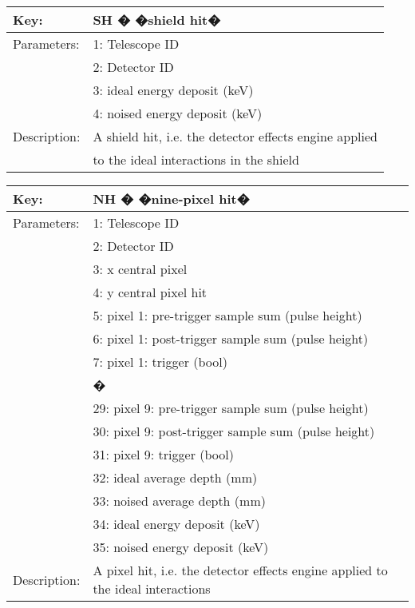 \begin{table}[htdp]
\begin{center}
\begin{tabular}{|p{2cm}|p{12cm}|}
\hline
Key:&	SH � �shield hit�\\
\hline
Parameters:&	1: Telescope ID\\
&2: Detector ID\\
&3: ideal energy deposit (keV)\\
&4: noised energy deposit (keV)\\
\hline
Description:&	A shield hit, i.e. the detector effects engine applied \\
& to the ideal interactions in the shield\\
\hline
\end{tabular}
\end{center}
\end{table}

\begin{table}[htdp]
\begin{center}
\begin{tabular}{|p{2cm}|p{12cm}|}
\hline
Key:&	NH � �nine-pixel hit�\\
\hline
Parameters:&	1: Telescope ID\\
&2: Detector ID\\
&3: x central pixel\\
&4: y central pixel hit\\
&5: pixel 1: pre-trigger sample sum (pulse height)\\
&6: pixel 1: post-trigger sample sum (pulse height)\\
&7: pixel 1: trigger (bool)\\
&�\\
&29: pixel 9: pre-trigger sample sum (pulse height)\\
&30: pixel 9: post-trigger sample sum (pulse height)\\
&31: pixel 9: trigger (bool)\\
&32: ideal average depth (mm)\\
&33: noised average depth (mm)\\
&34: ideal energy deposit (keV)\\
&35: noised energy deposit (keV)\\
\hline
Description:&	A pixel hit, i.e. the detector effects engine applied to the ideal interactions\\
\hline
\end{tabular}
\end{center}
\end{table}

